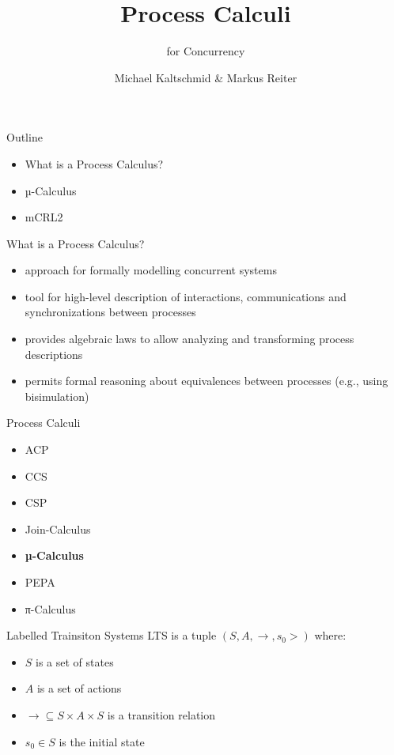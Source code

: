 \documentclass{beamer}
\title{Process Calculi}
\subtitle{for Concurrency}
\author{Michael Kaltschmid \& Markus Reiter}
\date{}
\begin{document}
  \maketitle

  \begin{frame}{Outline}
    \begin{itemize}
      \item What is a Process Calculus?
      \item µ-Calculus
      \item mCRL2
    \end{itemize}
  \end{frame}

  \begin{frame}{What is a Process Calculus?}
    \begin{itemize}
      \item approach for formally modelling concurrent systems
      \item tool for high-level description of interactions, communications and synchronizations between processes
      \item provides algebraic laws to allow analyzing and transforming process descriptions
      \item permits formal reasoning about equivalences between processes (e.g., using bisimulation)
    \end{itemize}
  \end{frame}

  \begin{frame}{Process Calculi}
    \begin{itemize}
      \item ACP
      \item CCS
      \item CSP
      \item Join-Calculus
      \item \textbf{µ-Calculus}
      \item PEPA
      \item π-Calculus
    \end{itemize}
  \end{frame}

  \begin{frame}{Labelled Trainsiton Systems}
    LTS is a tuple $(S, A, \to,s_0>)$ where: \\[12pt]
    \begin{itemize}
      \item $S$ is a set of states \\
      \item $A$ is a set of actions \\
      \item $\to \subseteq S \times A \times S$ is a transition relation \\
      \item $s_0 \in S$ is the initial state \\
    \end{itemize}
  \end{frame}
\end{document}
